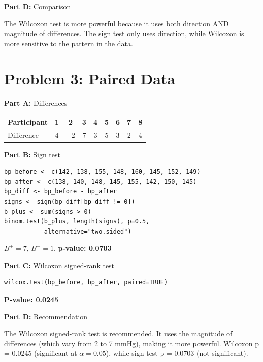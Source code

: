\documentclass[11pt]{article}
\begin{document}
\vspace{6pt}

\textbf{Part D:} Comparison

The Wilcoxon test is more powerful because it uses both direction AND magnitude of differences. The sign test only uses direction, while Wilcoxon is more sensitive to the pattern in the data.

\newpage

\section{Problem 3: Paired Data}

\textbf{Part A:} Differences

\begin{center}
\begin{tabular}{lcccccccc}
\toprule
Participant & 1 & 2 & 3 & 4 & 5 & 6 & 7 & 8 \\
\midrule
Difference & 4 & $-2$ & 7 & 3 & 5 & 3 & 2 & 4 \\
\bottomrule
\end{tabular}
\end{center}

\vspace{6pt}

\textbf{Part B:} Sign test

\begin{lstlisting}
bp_before <- c(142, 138, 155, 148, 160, 145, 152, 149)
bp_after <- c(138, 140, 148, 145, 155, 142, 150, 145)
bp_diff <- bp_before - bp_after
signs <- sign(bp_diff[bp_diff != 0])
b_plus <- sum(signs > 0)
binom.test(b_plus, length(signs), p=0.5,
           alternative="two.sided")
\end{lstlisting}

$B^+ = 7$, $B^- = 1$, \textbf{p-value: 0.0703}

\vspace{6pt}

\textbf{Part C:} Wilcoxon signed-rank test

\begin{lstlisting}
wilcox.test(bp_before, bp_after, paired=TRUE)
\end{lstlisting}

\textbf{P-value: 0.0245}

\vspace{6pt}

\textbf{Part D:} Recommendation

The Wilcoxon signed-rank test is recommended. It uses the magnitude of differences (which vary from 2 to 7 mmHg), making it more powerful. Wilcoxon p = 0.0245 (significant at $\alpha=0.05$), while sign test p = 0.0703 (not significant).
\end{document}

